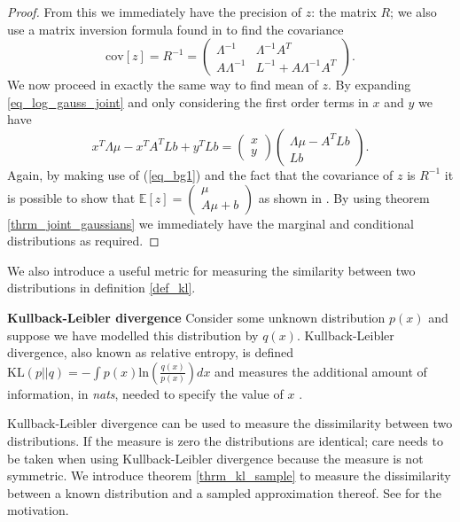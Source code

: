 \begin{proof}
From this we immediately have the precision of $z$: the matrix $R$; we also use a matrix inversion formula found in \cite{bishop} to find the covariance
\begin{equation}
\text{cov}[z] = R^{-1} = \begin{pmatrix}
\Lambda^{-1} & \Lambda^{-1}A^T \\ A\Lambda^{-1} & L^{-1}+A\Lambda^{-1}A^T
\end{pmatrix}.
\label{eq_gauss_covar}
\end{equation}
We now proceed in exactly the same way to find mean of $z$. By expanding \ref{eq_log_gauss_joint} and only considering the first order terms in $x$ and $y$ we have
\begin{equation}
x^T\Lambda\mu-x^TA^TLb+y^TLb = \begin{pmatrix}
x \\ y
\end{pmatrix}\begin{pmatrix}
\Lambda\mu - A^TLb \\Lb
\end{pmatrix}.
\label{eq_gauss_mean1}
\end{equation}
Again, by making use of (\ref{eq_bg1}) and the fact that the covariance of $z$ is $R^{-1}$ it is possible to show that $\mathbb{E}[z]=\begin{pmatrix}
\mu \\ A\mu +b
\end{pmatrix}$ as shown in \cite{bishop}. By using theorem \ref{thrm_joint_gaussians} we immediately have the marginal and conditional distributions as required.
\end{proof}
We also introduce a useful metric for measuring the similarity between two distributions in definition \ref{def_kl}. 
\begin{defn}
\textbf{Kullback-Leibler divergence} Consider some unknown distribution $p(x)$ and suppose we have modelled this distribution by $q(x)$. Kullback-Leibler divergence, also known as relative entropy, is defined $\text{KL}(p||q) = -\int p(x)\text{ln}\left(\frac{q(x)}{p(x)}\right)dx$ and measures the additional amount of information, in \emph{nats}, needed to specify the value of $x$ \cite{bishop}. 
\label{def_kl}
\end{defn}
Kullback-Leibler divergence can be used to measure the dissimilarity between two distributions. If the measure is zero the distributions are identical; care needs to be taken when using Kullback-Leibler divergence because the measure is not symmetric. We introduce theorem \ref{thrm_kl_sample} to measure the dissimilarity between a known distribution and a sampled approximation thereof. See \cite{bishop} for the motivation.
